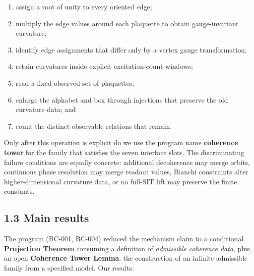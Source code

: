 \documentclass[
  american,
  11pt,
  letterpaper,
]{article}
\providecommand{\tightlist}{%
  \setlength{\itemsep}{0pt}\setlength{\parskip}{0pt}}
\begin{document}
\begin{enumerate}
\def\labelenumi{\arabic{enumi}.}
\tightlist
\item
  assign a root of unity to every oriented edge;
\item
  multiply the edge values around each plaquette to obtain gauge-invariant curvature;
\item
  identify edge assignments that differ only by a vertex gauge transformation;
\item
  retain curvatures inside explicit excitation-count windows;
\item
  read a fixed observed set of plaquettes;
\item
  enlarge the alphabet and box through injections that preserve the old curvature data; and
\item
  count the distinct observable relations that remain.
\end{enumerate}

Only after this operation is explicit do we use the program name \textbf{coherence tower} for the family that satisfies the seven interface slots. The discriminating failure conditions are equally concrete: additional decoherence may merge orbits, continuous phase resolution may merge readout values, Bianchi constraints alter higher-dimensional curvature data, or no full-SIT lift may preserve the finite constants.

\subsection{1.3 Main results}\label{main-results}

The program (BC-001, BC-004) reduced the mechanism claim to a conditional \textbf{Projection Theorem} consuming a definition of \emph{admissible coherence data}, plus an open \textbf{Coherence Tower Lemma}: the construction of an infinite admissible family from a specified model. Our results:
\end{document}
